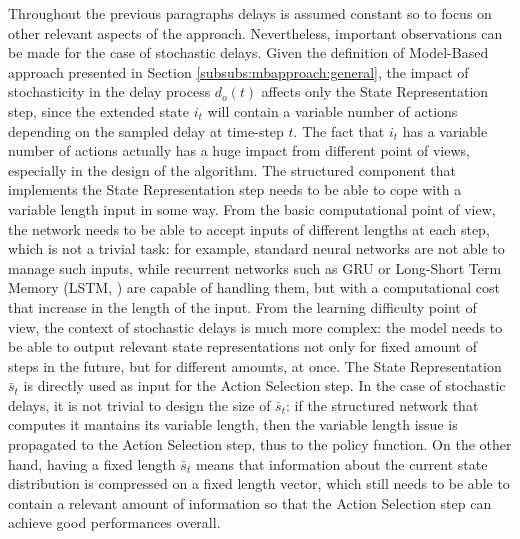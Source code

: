                 Throughout the previous paragraphs delays is assumed constant so to focus on other relevant aspects of the approach. Nevertheless, important observations can be made for the case of stochastic delays. Given the definition of Model-Based approach presented in Section \ref{subsubs:mbapproach:general}, the impact of stochasticity in the delay process $d_o(t)$ affects only the State Representation step, since the extended state $i_t$ will contain a variable number of actions depending on the sampled delay at time-step $t$. The fact that $i_t$ has a variable number of actions actually has a huge impact from different point of views, especially in the design of the algorithm. \newline
                The structured component that implements the State Representation step needs to be able to cope with a variable length input in some way. From the basic computational point of view, the network needs to be able to accept inputs of different lengths at each step, which is not a trivial task: for example, standard neural networks are not able to manage such inputs, while recurrent networks such as GRU or Long-Short Term Memory (LSTM, ) are capable of handling them, but with a computational cost that increase in the length of the input. From the learning difficulty point of view, the context of stochastic delays is much more complex: the model needs to be able to output relevant state representations not only for fixed amount of steps in the future, but for different amounts, at once. \newline
                The State Representation $\bar{s}_t$ is directly used as input for the Action Selection step. In the case of stochastic delays, it is not trivial to design the size of $\bar{s}_t$: if the structured network that computes it  mantains its variable length, then the variable length issue is propagated to the Action Selection step, thus to the policy function. On the other hand, having a fixed length $\bar{s}_t$ means that information about the current state distribution is compressed on a fixed length vector, which still needs to be able to contain a relevant amount of information so that the Action Selection step can achieve good performances overall. \newline
